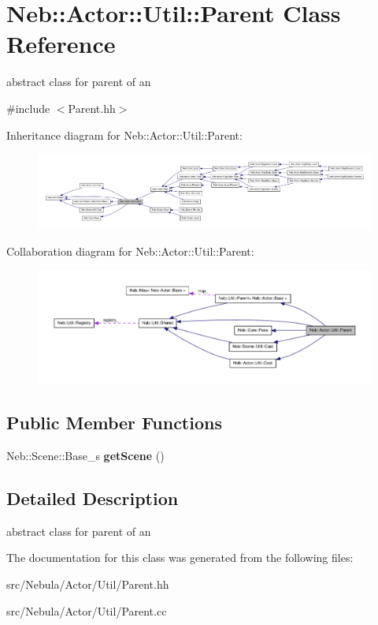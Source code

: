 \hypertarget{classNeb_1_1Actor_1_1Util_1_1Parent}{\section{\-Neb\-:\-:\-Actor\-:\-:\-Util\-:\-:\-Parent \-Class \-Reference}
\label{classNeb_1_1Actor_1_1Util_1_1Parent}
}


abstract class for parent of an   




{\ttfamily \#include $<$\-Parent.\-hh$>$}



\-Inheritance diagram for \-Neb\-:\-:\-Actor\-:\-:\-Util\-:\-:\-Parent\-:\nopagebreak
\begin{figure}[H]
\begin{center}
\leavevmode
\includegraphics[width=350pt]{classNeb_1_1Actor_1_1Util_1_1Parent__inherit__graph}
\end{center}
\end{figure}


\-Collaboration diagram for \-Neb\-:\-:\-Actor\-:\-:\-Util\-:\-:\-Parent\-:\nopagebreak
\begin{figure}[H]
\begin{center}
\leavevmode
\includegraphics[width=350pt]{classNeb_1_1Actor_1_1Util_1_1Parent__coll__graph}
\end{center}
\end{figure}
\subsection*{\-Public \-Member \-Functions}
\begin{DoxyCompactItemize}
\item 
\hypertarget{classNeb_1_1Actor_1_1Util_1_1Parent_a57e146291377e847f2151da71cfb78aa}{\-Neb\-::\-Scene\-::\-Base\-\_\-s {\bfseries get\-Scene} ()}\label{classNeb_1_1Actor_1_1Util_1_1Parent_a57e146291377e847f2151da71cfb78aa}

\end{DoxyCompactItemize}


\subsection{\-Detailed \-Description}
abstract class for parent of an  

\-The documentation for this class was generated from the following files\-:\begin{DoxyCompactItemize}
\item 
src/\-Nebula/\-Actor/\-Util/\-Parent.\-hh\item 
src/\-Nebula/\-Actor/\-Util/\-Parent.\-cc\end{DoxyCompactItemize}
